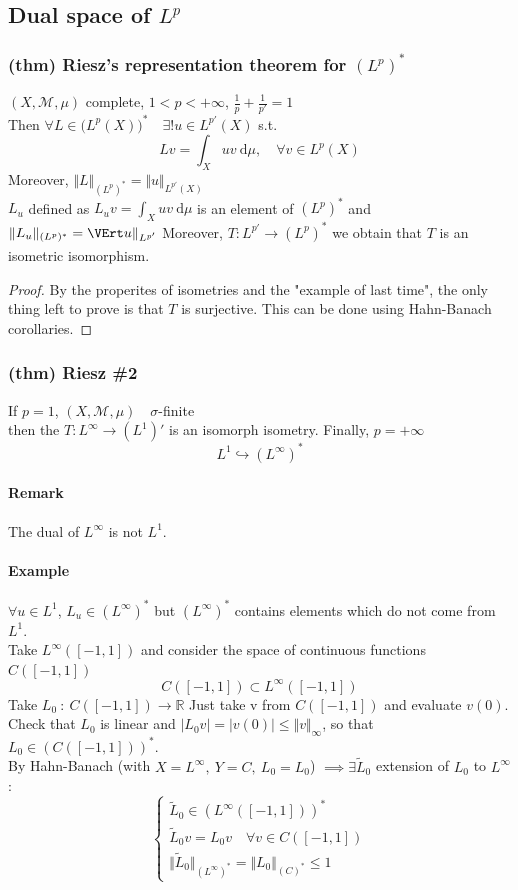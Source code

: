 \subsection{Dual space of $L^p$}
\subsubsection{(thm) Riesz's representation theorem for $(L^p)^*$}
$(X,\mathcal M,\mu)$ complete, $1<p<+\infty$, $\frac 1p+\frac 1{p'}=1$\\
Then $\forall L\in \Big (L^p(X)\Big )^*\quad \exists ! u\in L^{p'}(X)$ s.t. $$Lv =\int_X uv\ \mathrm d \mu, \quad \forall v \in L^p(X)$$
Moreover, $\Vert L\Vert_{(L^p)^*} =\Vert u\Vert _{L^{p'}(X)}$\\
$L_u$ defined as $L_uv=\int_X uv\ \mathrm d\mu$ is an element of $(L^p)^*$ and $\Vert L_u\Vert_{(L^p)^*}=\VErt u\Vert _{L^{p'}}$
Moreover, $T:L^{p'}\xrightarrow[\quad]{}(L^p)^*$ we obtain that $T$ is an isometric isomorphism.
\begin{proof}
    By the properites of isometries and the "example of last time", the only thing left to prove is that $T$ is surjective. This can be done using Hahn-Banach corollaries.
    
\end{proof} 
\subsubsection{(thm) Riesz \#2}
If $p=1$, $(X,\mathcal M,\mu)\quad \sigma$-finite\\
then the $T:L^\infty\to (L^1)'$ is an isomorph isometry.
Finally, $p=+\infty $
$$L^1\hookrightarrow(L^\infty)^*$$
\paragraph{Remark}
The dual of $L^\infty$ is not $L^1$.
\paragraph{Example}
$\forall u\in L^1$, $L_u\in (L^\infty)^*$ but $(L^\infty)^*$ contains elements which do not come from $L^1$.\\
Take $L^\infty([-1,1])$ and consider the space of continuous functions $C([-1,1])$
$$C([-1,1])\subset L^\infty([-1,1])$$
Take $L_0\ : \ C([-1,1])\to \mathbb R$ Just take v from $C([-1,1])$ and evaluate $v(0)$.\\
Check that $L_0$ is linear and $|L_0v|=|v(0)|\leq \Vert v\Vert _\infty$, so that $L_0\in (C([-1,1]))^*$.\\
By Hahn-Banach (with $X=L^\infty, \ Y=C, \ L_0=L_0$) $\implies \exists \tilde L_0$ extension of $L_0$ to $L^\infty$:
$$\begin{cases}
    \tilde L_0\in (L^\infty ([-1,1]))^*\\
    \tilde L_0v=L_0v\quad \forall v\in C([-1,1])\\
    \Vert \tilde L_0\Vert _{(L^\infty)^*}=\Vert L_0\Vert_{(C)^*}\leq 1
\end{cases}$$
